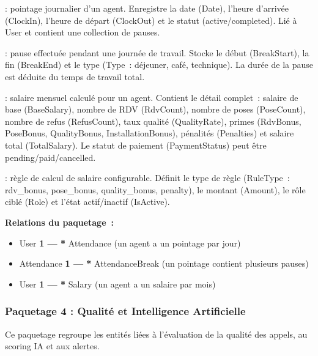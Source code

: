\begin{description}[itemsep=4pt]
    \item[\textbf{Attendance}] : pointage journalier d'un agent. Enregistre la date
    (Date), l'heure d'arrivée (ClockIn), l'heure de départ (ClockOut) et le statut
    (active/completed). Lié à User et contient une collection de pauses.

    \item[\textbf{AttendanceBreak}] : pause effectuée pendant une journée de travail.
    Stocke le début (BreakStart), la fin (BreakEnd) et le type (Type~: déjeuner,
    café, technique). La durée de la pause est déduite du temps de travail total.

    \item[\textbf{Salary}] : salaire mensuel calculé pour un agent. Contient le
    détail complet~: salaire de base (BaseSalary), nombre de RDV (RdvCount),
    nombre de poses (PoseCount), nombre de refus (RefusCount), taux qualité
    (QualityRate), primes (RdvBonus, PoseBonus, QualityBonus, InstallationBonus),
    pénalités (Penalties) et salaire total (TotalSalary). Le statut de paiement
    (PaymentStatus) peut être pending/paid/cancelled.

    \item[\textbf{SalaryRule}] : règle de calcul de salaire configurable. Définit
    le type de règle (RuleType~: rdv\_bonus, pose\_bonus, quality\_bonus,
    penalty), le montant (Amount), le rôle ciblé (Role) et l'état actif/inactif
    (IsActive).
\end{description}

\textbf{Relations du paquetage~:}
\begin{itemize}
    \item User \textbf{1 --- *} Attendance (un agent a un pointage par jour)
    \item Attendance \textbf{1 --- *} AttendanceBreak (un pointage contient plusieurs pauses)
    \item User \textbf{1 --- *} Salary (un agent a un salaire par mois)
\end{itemize}

\subsubsection{Paquetage 4 : Qualité et Intelligence Artificielle}

Ce paquetage regroupe les entités liées à l'évaluation de la qualité des appels,
au scoring IA et aux alertes.

